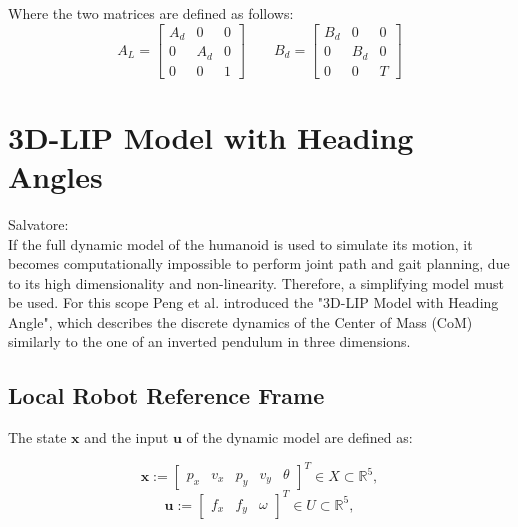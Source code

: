 \documentclass[main.tex]{subfiles}
\begin{document}
Where the two matrices are defined as follows:
\begin{equation}
    A_{L} = 
    \begin{bmatrix}
        A_{d} & 0 & 0 \\
        0 & A_{d} & 0 \\
        0 & 0 & 1
    \end{bmatrix}
    \qquad
    B_{d} = 
    \begin{bmatrix}
        B_{d} & 0 & 0 \\
        0 & B_{d} & 0 \\
        0 & 0 & T
    \end{bmatrix}
\end{equation}




\section{3D-LIP Model with Heading Angles}\label{sec:lip}
Salvatore:\\
If the full dynamic model of the humanoid is used to simulate its motion, it becomes computationally impossible to perform joint path and gait planning, due to its high dimensionality and non-linearity. Therefore, a simplifying model must be used. For this scope Peng et al. introduced the "3D-LIP Model with Heading Angle", which describes the discrete dynamics of the Center of Mass (CoM) similarly to the one of an inverted pendulum in three dimensions.

\subsection{Local Robot Reference Frame}
The state $\mathbf{x}$ and the input $\mathbf{u}$ of the dynamic model are defined as:

$$ \mathbf{x} := \begin{bmatrix} p_x & v_x & p_y & v_y & \theta \end{bmatrix}^T \in X \subset \mathbb{R}^5 , $$
$$ \mathbf{u} := \begin{bmatrix} f_x & f_y & \omega \end{bmatrix}^T \in U \subset \mathbb{R}^5 , $$
\end{document}
